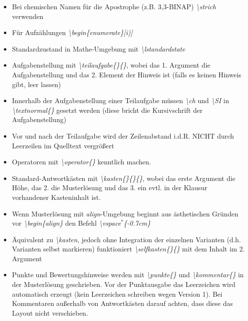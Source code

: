 \documentclass[./main.tex]{subfiles}
\begin{document}
\begin{itemize}
    \item Bei chemischen Namen f\"ur die Apostrophe (z.B. 3,3\strich-BINAP) \hypertarget{strich}{\textit{\textbackslash strich}} verwenden
    \item F\"ur Aufz\"ahlungen \hypertarget{beginenumerate}{\textit{\textbackslash begin\{enumerate\}[i)]}}
    \item Standardzustand in Mathe-Umgebung mit \textit{\hypertarget{lstandardstate}{\textbackslash lstandardstate}}
    \item Aufgabenstellung mit \textit{\textbackslash teilaufgabe\{\}\{\}}, wobei das 1. Argument die Aufgabenstellung und das 2. Element der Hinweis ist (falls es keinen Hinweis gibt, leer lassen)
    \item \hypertarget{textnormal}{} Innerhalb der Aufgabenstellung einer Teilaufgabe m\"ussen \textit{\textbackslash ch} und \textit{\textbackslash SI} in \textit{\textbackslash textnormal\{\}} gesetzt werden (diese bricht die Kursivschrift der Aufgabenstellung)
    \item Vor und nach der Teilaufgabe wird der Zeilenabstand i.d.R. NICHT durch Leerzeilen im Quelltext vergr\"o\ss{}ert
    \item Operatoren mit \textit{\hypertarget{operator}{\textbackslash operator\{\}}} kenntlich machen. 
    \item Standard-Antwortk\"asten mit \textit{\hypertarget{kasten}{\textbackslash kasten\{\}\{\}\{\}}}, wobei das erste Argument die H\"ohe, das 2. die Musterl\"osung und das 3. ein evtl. in der Klausur vorhandener Kasteninhalt ist. 
    \item \hypertarget{vspace}{} Wenn Musterl\"osung mit \textit{align}-Umgebung beginnt aus \"asthetischen Gr\"unden vor \textit{\textbackslash begin\{align\}} den Befehl \textit{\textbackslash vspace$^*$\{-0.7cm\}}
    \item \"Aquivalent zu \textit{\textbackslash kasten}, jedoch ohne Integration der einzelnen Varianten (d.h. Varianten selbst markieren) funktioniert \textit{\hypertarget{selfkasten}{\textbackslash selfkasten\{\}\{\}}} mit dem Inhalt im 2. Argument
    \item Punkte und Bewertungshinweise werden mit \hypertarget{punkte}{\textit{\textbackslash punkte\{\}}} und \hypertarget{kommentar}{\textit{\textbackslash kommentar\{\}}} in der Musterl\"osung geschrieben. Vor der Punktausgabe das Leerzeichen wird automatisch erzeugt (kein Leerzeichen schreiben wegen Version 1). Bei Kommentaren au\ss{}erhalb von Antwortk\"asten darauf achten, dass diese das Layout nicht verschieben.

\end{itemize}
\end{document}
